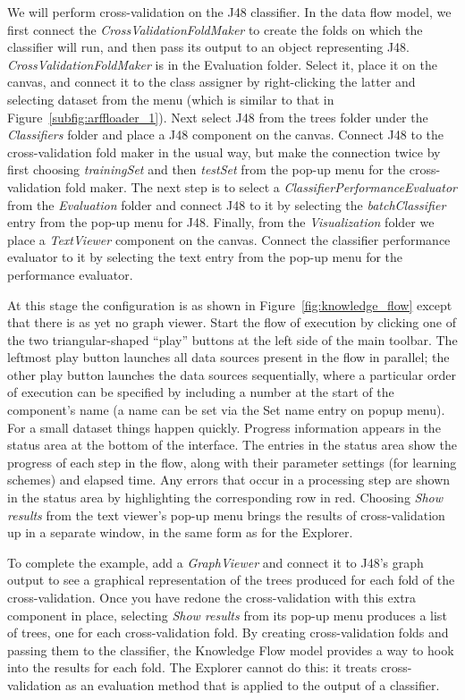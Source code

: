 We will perform cross-validation on the J48 classifier. In the data
flow model, we first connect the \textit{CrossValidationFoldMaker} to
create the folds on which the classifier will run, and then pass its
output to an object representing
J48. \textit{CrossValidationFoldMaker} is in the Evaluation
folder. Select it, place it on the canvas, and connect it to the class
assigner by right-clicking the latter and selecting dataset from the
menu (which is similar to that in
Figure~\ref{subfig:arffloader_1}). Next select J48 from the trees
folder under the \textit{Classifiers} folder and place a J48 component on the
canvas. Connect J48 to the cross-validation fold maker in the usual
way, but make the connection twice by first choosing \textit{trainingSet} and
then \textit{testSet} from the pop-up menu for the cross-validation fold
maker. The next step is to select a \textit{ClassifierPerformanceEvaluator}
from the \textit{Evaluation} folder and connect J48 to it by selecting the
\textit{batchClassifier} entry from the pop-up menu for J48. Finally, from the
\textit{Visualization} folder we place a \textit{TextViewer} component on the
canvas. Connect the classifier performance evaluator to it by
selecting the text entry from the pop-up menu for the performance
evaluator.

At this stage the configuration is as shown in
Figure~\ref{fig:knowledge_flow} except that there is as yet no graph
viewer. Start the flow of execution by clicking one of the two
triangular-shaped ``play'' buttons at the left side of the main
toolbar. The leftmost play button launches all data sources present in
the flow in parallel; the other play button launches the data sources
sequentially, where a particular order of execution can be specified
by including a number at the start of the component's name (a name can
be set via the Set name entry on popup menu). For a small dataset
things happen quickly. Progress information appears in the status area
at the bottom of the interface. The entries in the status area show
the progress of each step in the flow, along with their parameter
settings (for learning schemes) and elapsed time. Any errors that
occur in a processing step are shown in the status area by
highlighting the corresponding row in red. Choosing \textit{Show
results} from the text viewer's pop-up menu brings the results of
cross-validation up in a separate window, in the same form as for the
Explorer.

To complete the example, add a \textit{GraphViewer} and connect it to
J48's graph output to see a graphical representation of the trees
produced for each fold of the cross-validation. Once you have redone
the cross-validation with this extra component in place,
selecting \textit{Show results} from its pop-up menu produces a list
of trees, one for each cross-validation fold. By creating
cross-validation folds and passing them to the classifier, the
Knowledge Flow model provides a way to hook into the results for each
fold. The Explorer cannot do this: it treats cross-validation as an
evaluation method that is applied to the output of a classifier.

